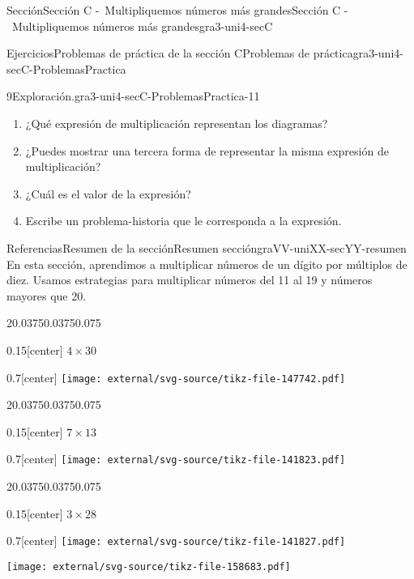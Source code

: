 \documentclass[twoside,10pt,]{article}
\begin{document}
\begin{sectionptx}{Sección}{Sección C -~Multipliquemos números más grandes}{}{Sección C -~Multipliquemos números más grandes}{}{}{gra3-uni4-secC}
\begin{exercises-subsection}{Ejercicios}{Problemas de práctica de la sección C}{}{Problemas de práctica}{}{}{gra3-uni4-secC-ProblemasPractica}
\begin{divisionexercise}{9}{Exploración.}{}{gra3-uni4-secC-ProblemasPractica-11}
\begin{enumerate}[label=(\alph*)]
\item{}¿Qué expresión de multiplicación representan los diagramas?%
\item{}¿Puedes mostrar una tercera forma de representar la misma expresión de multiplicación?%
\item{}¿Cuál es el valor de la expresión?%
\item{}Escribe un problema-historia que le corresponda a la expresión.%
\end{enumerate}
\end{divisionexercise}%
\end{exercises-subsection}
%
%
\typeout{************************************************}
\typeout{************************************************}
%
\begin{references-subsection}{Referencias}{Resumen de la sección}{}{Resumen sección}{}{}{graVV-uniXX-secYY-resumen}
En esta sección, aprendimos a multiplicar números de un dígito por múltiplos de diez. Usamos estrategias para multiplicar números del 11 al 19 y números mayores que 20.%
\begin{sidebyside}{2}{0.0375}{0.0375}{0.075}%
\begin{sbspanel}{0.15}[center]%
\(4\times 30\)%
\end{sbspanel}%
\begin{sbspanel}{0.7}[center]%
\texttt{[image: external/svg-source/tikz-file-147742.pdf]}
\end{sbspanel}%
\end{sidebyside}%
\begin{sidebyside}{2}{0.0375}{0.0375}{0.075}%
\begin{sbspanel}{0.15}[center]%
\(7\times 13\)%
\end{sbspanel}%
\begin{sbspanel}{0.7}[center]%
\texttt{[image: external/svg-source/tikz-file-141823.pdf]}
\end{sbspanel}%
\end{sidebyside}%
\begin{sidebyside}{2}{0.0375}{0.0375}{0.075}%
\begin{sbspanel}{0.15}[center]%
\(3\times 28\)%
\end{sbspanel}%
\begin{sbspanel}{0.7}[center]%
\texttt{[image: external/svg-source/tikz-file-141827.pdf]}
\par
\texttt{[image: external/svg-source/tikz-file-158683.pdf]}
\end{sbspanel}%
\end{sidebyside}%
\end{references-subsection}
\end{sectionptx}
\end{document}
